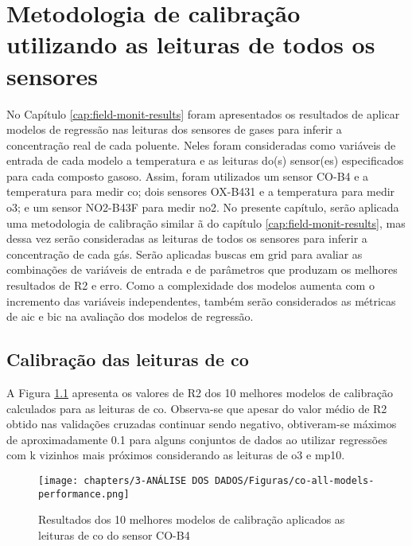 
\chapter{Metodologia de calibração utilizando as leituras de todos os sensores}\label{cap:calib-methodology}

No Capítulo \ref{cap:field-monit-results} foram apresentados os resultados de aplicar modelos de regressão nas leituras dos sensores de gases para inferir a concentração real de cada poluente. Neles foram consideradas como variáveis de entrada de cada modelo a temperatura e as leituras do(s) sensor(es) especificados para cada composto gasoso. Assim, foram utilizados um sensor CO-B4 e a temperatura para medir \acrshort{co}; dois sensores OX-B431 e a temperatura para medir \acrshort{o3}; e um sensor NO2-B43F para medir \acrshort{no2}. No presente capítulo, serão aplicada uma metodologia de calibração similar ã do capítulo \ref{cap:field-monit-results}, mas dessa vez serão consideradas as leituras de todos os sensores para inferir a concentração de cada gás. Serão aplicadas buscas em grid para avaliar as combinações de variáveis de entrada e de parâmetros que produzam os melhores resultados de R2 e erro. Como a complexidade dos modelos aumenta com o incremento das variáveis independentes, também serão considerados as métricas de \acrshort{aic} e \acrshort{bic} na avaliação dos modelos de regressão.

\section{Calibração das leituras de \acrshort{co}}

A Figura \ref{fig:data-co-all-models-performance} apresenta os valores de R2 dos 10 melhores modelos de calibração calculados para as leituras de \acrshort{co}. Observa-se que apesar do valor médio de R2 obtido nas validações cruzadas continuar sendo negativo, obtiveram-se máximos de aproximadamente 0.1 para alguns conjuntos de dados ao utilizar regressões com k vizinhos mais próximos considerando as leituras de \acrshort{o3} e \acrshort{mp10}.

\begin{figure}[h]
    \centering
    \caption{Resultados dos 10 melhores modelos de calibração aplicados as leituras de \acrshort{co} do sensor CO-B4}
    \texttt{[image: chapters/3-ANÁLISE DOS DADOS/Figuras/co-all-models-performance.png]}
    \label{fig:data-co-all-models-performance}
\end{figure}

